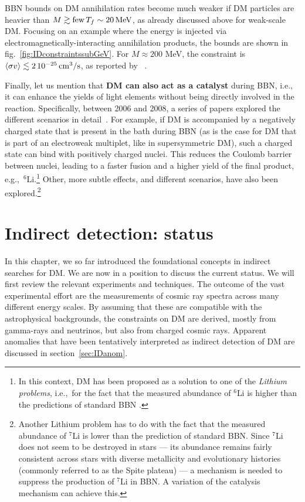 BBN bounds on DM annihilation rates become much weaker 
if DM particles are heavier than $M \gtrsim \hbox{few} \,T_f\sim 20\,{\rm MeV}$, 
as already discussed above for weak-scale DM. 
Focusing on an example where the energy is injected via electromagnetically-interacting annihilation products, 
the bounds are shown in fig.~\ref{fig:IDconstraintssubGeV}. For $M \approx 200$ MeV, 
the constraint is $\langle \sigma v \rangle \lesssim 2 \, 10^{-25} \,{\rm cm}^3/{\rm s}$,
as reported by ~\cite{BBNbounds}.

\medskip

Finally, let us mention that {\bf DM can also act as a catalyst} during BBN, i.e., it can enhance the yields of light elements without being directly involved in the reaction. Specifically, between 2006 and 2008, a series of papers explored the different scenarios in detail~\cite{CBBN}. For example, if DM is accompanied by a negatively charged state that is present in the bath during BBN (as is the case for DM that is part of an electroweak multiplet, like in supersymmetric DM), such a charged state can bind with positively charged nuclei. This reduces the Coulomb barrier between nuclei, leading to a faster fusion and a higher yield of the final product, e.g.,~$^6$Li.\footnote{In this context, DM has been proposed as a solution to one of the {\em Lithium problems}, i.e.,~for the fact that the measured abundance of $^6$Li is higher than the predictions of standard BBN \cite{LithiumProblem}.} Other, more subtle effects, and different scenarios, have also been explored.\footnote{Another Lithium problem has to do with the fact that the measured abundance of $^7$Li is lower than the prediction of standard BBN. Since $^7$Li does not seem to be destroyed in stars --- its abundance remains fairly consistent across stars with diverse metallicity and evolutionary histories (commonly referred to as the Spite plateau) --- a mechanism is needed to suppress the production of $^7$Li in BBN. A variation of the catalysis mechanism can achieve this.}




\section{Indirect detection:  status}
\label{sec:IDstatus}
In this chapter, we so far introduced the foundational concepts in indirect searches for DM.
We are now in a position to discuss the current status.
We will first review the relevant experiments and techniques.
The outcome of the vast experimental effort are the measurements of cosmic ray spectra across many different energy scales.
By assuming that these are compatible with the astrophysical backgrounds, the constraints on DM are derived,
mostly from gamma-rays and neutrinos, but also from charged cosmic rays.
Apparent anomalies that have been tentatively interpreted as indirect detection of DM are discussed in section~\ref{sec:IDanom}. 



